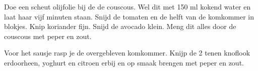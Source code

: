\documentclass[a4paper]{recipe}
\begin{document}

Doe een scheut olijfolie bij de de couscous. Wel dit met 150 ml kokend water en laat haar vijf minuten staan. Snijd de tomaten en de helft van de komkommer in blokjes. Knip koriander fijn. Snijd de avocado klein. Meng dit alles door de couscous met peper en zout.

Voor het sausje rasp je de overgebleven komkommer. Knijp de 2 tenen knoflook erdoorheen, yoghurt en citroen erbij en op smaak brengen met peper en zout.
\end{document}

